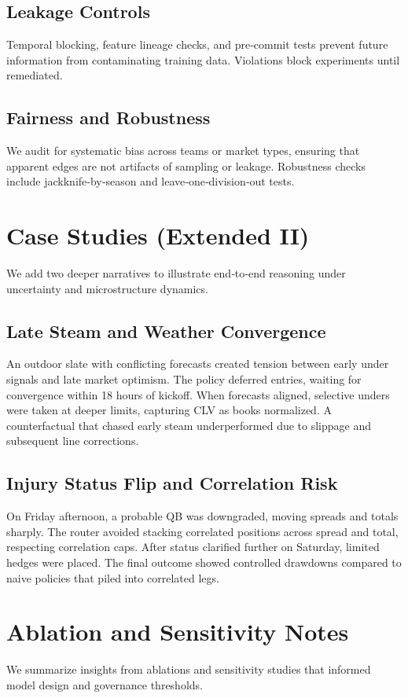 \documentclass[12pt]{report}  %
\numberwithin{equation}{section}
\theoremstyle{plain}
\theoremstyle{definition}
\theoremstyle{remark}
\begin{document}
\section{Leakage Controls}
Temporal blocking, feature lineage checks, and pre‑commit tests prevent future information from contaminating training data. Violations block experiments until remediated.

\section{Fairness and Robustness}
We audit for systematic bias across teams or market types, ensuring that apparent edges are not artifacts of sampling or leakage. Robustness checks include jackknife‑by‑season and leave‑one‑division‑out tests.

\chapter{Case Studies (Extended II)}
We add two deeper narratives to illustrate end‑to‑end reasoning under uncertainty and microstructure dynamics.

\section{Late Steam and Weather Convergence}
An outdoor slate with conflicting forecasts created tension between early under signals and late market optimism. The policy deferred entries, waiting for convergence within 18 hours of kickoff. When forecasts aligned, selective unders were taken at deeper limits, capturing CLV as books normalized. A counterfactual that chased early steam underperformed due to slippage and subsequent line corrections.

\section{Injury Status Flip and Correlation Risk}
On Friday afternoon, a probable QB was downgraded, moving spreads and totals sharply. The router avoided stacking correlated positions across spread and total, respecting correlation caps. After status clarified further on Saturday, limited hedges were placed. The final outcome showed controlled drawdowns compared to naive policies that piled into correlated legs.

\chapter{Ablation and Sensitivity Notes}
We summarize insights from ablations and sensitivity studies that informed model design and governance thresholds.
\end{document}
